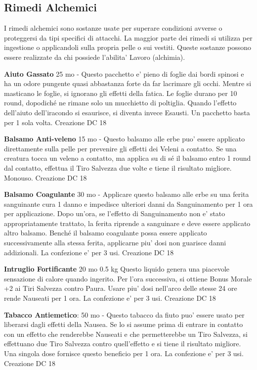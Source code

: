 \documentclass[a4paper,11pt,twoside,openany]{dndbook}
\begin{document}
{\subsection{Rimedi Alchemici}

\label{rimedi-alchemici}

I rimedi alchemici sono sostanze usate per superare condizioni avverse o proteggersi da tipi specifici di attacchi. La maggior parte dei rimedi si utilizza per ingestione o applicandoli sulla propria pelle o sui vestiti. Queste sostanze possono essere realizzate da chi possiede l'abilita' Lavoro (alchimia).

\textbf{Aiuto Gassato} 25 mo - Questo pacchetto e' pieno di foglie dai bordi spinosi e ha un odore pungente quasi abbastanza forte da far lacrimare gli occhi. Mentre si masticano le foglie, si ignorano gli effetti della fatica. Le foglie durano per 10 round, dopodiché ne rimane solo un mucchietto di poltiglia. Quando l'effetto dell'aiuto dell'iracondo si esaurisce, si diventa invece Esausti. Un pacchetto basta per 1 sola volta. Creazione DC 18

\textbf{Balsamo Anti-veleno} 15 mo - Questo balsamo alle erbe puo' essere applicato direttamente sulla pelle per prevenire gli effetti dei Veleni a contatto. Se una creatura tocca un veleno a contatto, ma applica su di sé il balsamo entro 1 round dal contatto, effettua il Tiro Salvezza due volte e tiene il risultato migliore. Monouso. Creazione DC 18

\textbf{Balsamo Coagulante} 30 mo - Applicare questo balsamo alle erbe su una ferita sanguinante cura 1 danno e impedisce ulteriori danni da Sanguinamento per 1 ora per applicazione. Dopo un'ora, se l'effetto di Sanguinamento non e' stato appropriatamente trattato, la ferita riprende a sanguinare e deve essere applicato altro balsamo. Benché il balsamo coagulante possa essere applicato successivamente alla stessa ferita, applicarne piu' dosi non guarisce danni addizionali. La confezione e' per 3 usi. Creazione DC 18

\textbf{Intruglio Fortificante} 20 mo 0.5 kg Questo liquido genera una piacevole sensazione di calore quando ingerito. Per l'ora successiva, si ottiene Bonus Morale +2 ai Tiri Salvezza contro Paura. Usare piu' dosi nell'arco delle stesse 24 ore rende Nauseati per 1 ora. La confezione e' per 3 usi. Creazione DC 18

\textbf{Tabacco Antiemetico}: 50 mo - Questo tabacco da fiuto puo' essere usato per liberarsi dagli effetti della Nausea. Se lo si assume prima di entrare in contatto con un effetto che renderebbe Nauseati e che permetterebbe un Tiro Salvezza, si effettuano due Tiro Salvezza contro quell'effetto e si tiene il risultato migliore. Una singola dose fornisce questo beneficio per 1 ora. La confezione e’ per 3 usi. Creazione DC 18

}
\end{document}
